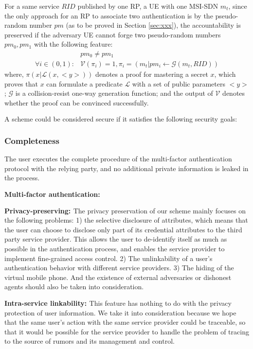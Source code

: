 \begin{definition}
	For a same service $RID$ published by one RP, a UE with one MSI-SDN $m_t$, since the only approach for an RP to associate two authentication is by the pseudo-random number $pm$ (as to be proved in Section \ref{sec:xxx}), the accountability is preserved if the adversary UE cannot forge two pseudo-random numbers $pm_0, pm_1$ with the following feature:
	\begin{align}
	&pm_0 \neq pm_1\\
	\forall i \in (0,1):&\mathcal{V}(\pi_i) = 1, \pi_i = (m_t|pm_i\gets\mathcal{G}(m_t, RID))
	\end{align}
	where, $\pi(x|\mathcal{L}(x, <y>))$ denotes a proof for mastering a secret $x$, which proves that $x$ can formulate a predicate $\mathcal{L}$ with a set of public parameters $<y>$; $\mathcal{G}$ is a collision-resist one-way generation function; and the output of $\mathcal{V}$ denotes whether the proof can be convinced successfully.
\end{definition}

A scheme could be considered secure if it satisfies the following security goals:
\subsubsection{Completeness}
The user executes the complete procedure of the multi-factor authentication protocol with the relying party, and no additional private information is leaked in the process.
\begin{list}{}{}
    \item{\bf{Multi-factor authentication: }}
    \item{\bf{Privacy-preserving: }}The privacy preservation of our scheme mainly focuses on the following problems: 1) the selective disclosure of attributes, which means that the user can choose to disclose only part of its credential attributes to the third party service provider. This allows the user to de-identify itself as much as possible in the authentication process, and enables the service provider to implement fine-grained access control. 2) The unlinkability of a user's authentication behavior with different service providers. 3) The hiding of the virtual mobile phone. And the existence of external adversaries or dishonest agents should also be taken into consideration.\\
    \item{\bf{Intra-service linkability: }}This feature has nothing to do with the privacy protection of user information. We take it into consideration because we hope that the same user's action with the same service provider could be traceable, so that it would be possible for the service provider to handle the problem of tracing to the source of rumors and its management and control.\\
\end{list}
